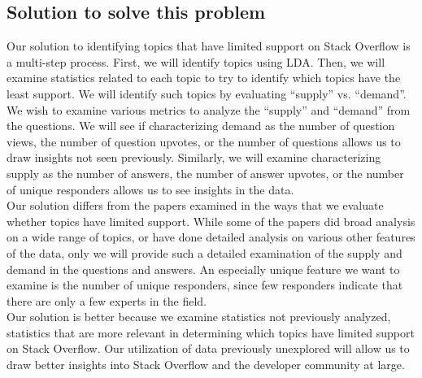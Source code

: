 \subsection{Solution to solve this problem}
	Our solution to identifying topics that have limited support on Stack Overflow is a multi-step process. First, we will identify topics using LDA. Then, we will examine statistics related to each topic to try to identify which topics have the least support. We will identify such topics by evaluating “supply” vs. “demand”. We wish to examine various metrics to analyze the “supply” and “demand” from the questions. We will see if characterizing demand as the number of question  views, the number of question upvotes, or the number of questions allows us to draw insights not seen previously. Similarly, we will examine characterizing supply as the number of answers, the number of answer upvotes, or the number of unique responders allows us to see insights in the data.\\
	Our solution differs from the papers examined in the ways that we evaluate whether topics have limited support. While some of the papers did broad analysis on a wide range of topics, or have done detailed analysis on various other features of the data, only we will provide such a detailed examination of the supply and demand in the questions and answers. An especially unique feature we want to examine is the number of unique responders, since few responders indicate that there are only a few experts in the field.\\
	Our solution is better because we examine statistics not previously analyzed, statistics that are more relevant in determining which topics have limited support on Stack Overflow. Our utilization of data previously unexplored will allow us to draw better insights into Stack Overflow and the developer community at large.


